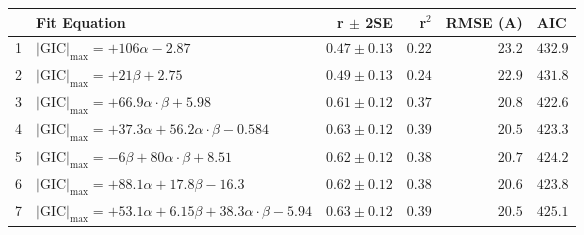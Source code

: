 \begin{tabular}{l l r r r}
 & Fit Equation & r $\pm$ 2SE & r$^2$ & RMSE (A) & AIC \\
 & $\vert{\text{GIC}\vert_\text{max}} = +106 \alpha  -2.87$ & $0.47 \pm 0.13$ & $0.22$ & $23.2$ & $432.9$ \\
2 & $\vert{\text{GIC}\vert_\text{max}} = +21 \beta  +2.75$ & $0.49 \pm 0.13$ & $0.24$ & $22.9$ & $431.8$ \\
3 & $\vert{\text{GIC}\vert_\text{max}} = +66.9 \alpha \cdot \beta  +5.98$ & $0.61 \pm 0.12$ & $0.37$ & $20.8$ & $422.6$ \\
4 & $\vert{\text{GIC}\vert_\text{max}} = +37.3 \alpha +56.2 \alpha \cdot \beta  -0.584$ & $0.63 \pm 0.12$ & $0.39$ & $20.5$ & $423.3$ \\
5 & $\vert{\text{GIC}\vert_\text{max}} = -6 \beta +80 \alpha \cdot \beta  +8.51$ & $0.62 \pm 0.12$ & $0.38$ & $20.7$ & $424.2$ \\
6 & $\vert{\text{GIC}\vert_\text{max}} = +88.1 \alpha +17.8 \beta  -16.3$ & $0.62 \pm 0.12$ & $0.38$ & $20.6$ & $423.8$ \\
7 & $\vert{\text{GIC}\vert_\text{max}} = +53.1 \alpha +6.15 \beta +38.3 \alpha \cdot \beta  -5.94$ & $0.63 \pm 0.12$ & $0.39$ & $20.5$ & $425.1$ \\
\end{tabular}
